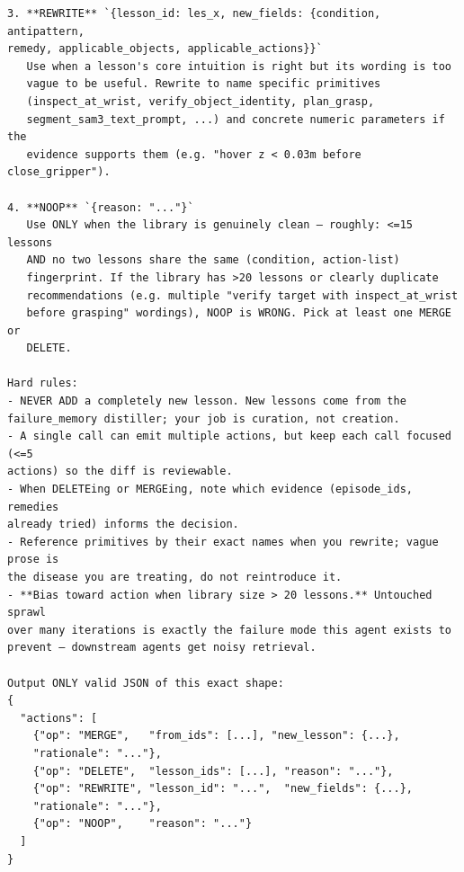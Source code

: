 \begin{lstlisting}[style=ratsappendixprompt]
3. **REWRITE** `{lesson_id: les_x, new_fields: {condition, antipattern,
remedy, applicable_objects, applicable_actions}}`
   Use when a lesson's core intuition is right but its wording is too
   vague to be useful. Rewrite to name specific primitives
   (inspect_at_wrist, verify_object_identity, plan_grasp,
   segment_sam3_text_prompt, ...) and concrete numeric parameters if the
   evidence supports them (e.g. "hover z < 0.03m before close_gripper").

4. **NOOP** `{reason: "..."}`
   Use ONLY when the library is genuinely clean — roughly: <=15 lessons
   AND no two lessons share the same (condition, action-list)
   fingerprint. If the library has >20 lessons or clearly duplicate
   recommendations (e.g. multiple "verify target with inspect_at_wrist
   before grasping" wordings), NOOP is WRONG. Pick at least one MERGE or
   DELETE.

Hard rules:
- NEVER ADD a completely new lesson. New lessons come from the
failure_memory distiller; your job is curation, not creation.
- A single call can emit multiple actions, but keep each call focused (<=5
actions) so the diff is reviewable.
- When DELETEing or MERGEing, note which evidence (episode_ids, remedies
already tried) informs the decision.
- Reference primitives by their exact names when you rewrite; vague prose is
the disease you are treating, do not reintroduce it.
- **Bias toward action when library size > 20 lessons.** Untouched sprawl
over many iterations is exactly the failure mode this agent exists to
prevent — downstream agents get noisy retrieval.

Output ONLY valid JSON of this exact shape:
{
  "actions": [
    {"op": "MERGE",   "from_ids": [...], "new_lesson": {...},
    "rationale": "..."},
    {"op": "DELETE",  "lesson_ids": [...], "reason": "..."},
    {"op": "REWRITE", "lesson_id": "...",  "new_fields": {...},
    "rationale": "..."},
    {"op": "NOOP",    "reason": "..."}
  ]
}
\end{lstlisting}

